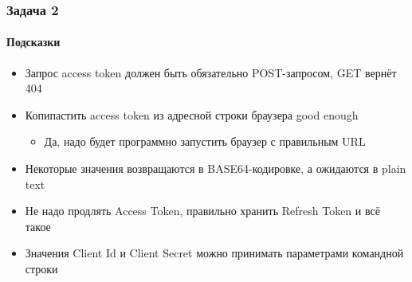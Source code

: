 \documentclass[xetex,mathserif,serif]{beamer}
\begin{document}
    \begin{frame}
        \frametitle{Задача 2}
        \framesubtitle{Подсказки}
        \begin{itemize}
            \item Запрос access token должен быть обязательно POST-запросом, GET вернёт 404
            \item Копипастить access token из адресной строки браузера good enough
            \begin{itemize}
                \item Да, надо будет программно запустить браузер с правильным URL
            \end{itemize}
            \item Некоторые значения возвращаются в BASE64-кодировке, а ожидаются в plain text
            \item Не надо продлять Access Token, правильно хранить Refresh Token и всё такое
            \item Значения Client Id и Client Secret можно принимать параметрами командной строки
        \end{itemize}
    \end{frame}
\end{document}
